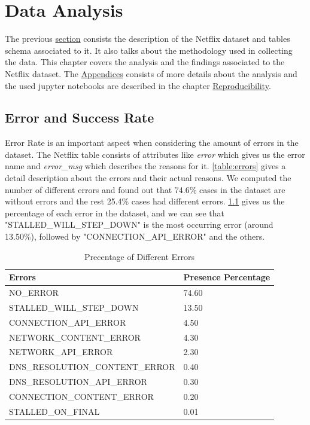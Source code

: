 \hypersetup{linkcolor=blue}
\chapter{Data Analysis}\label{chapter:Data Analysis}

The previous \hyperref[chapter:Datasets]{section} consists the description of the Netflix dataset and tables schema associated to it. It also talks about the methodology used in collecting the data. This chapter covers the analysis and the findings associated to the Netflix dataset. The \hyperref[appendix]{Appendices} consists of more details about the analysis and the used jupyter notebooks are described in the chapter \hyperref[chapter:Reproducibility]{Reproducibility}.   

\section{Error and Success Rate}\label{chapter:esrate}
Error Rate is an important aspect when considering the amount of errors in the dataset. The Netflix table consists of attributes like \textit{error} which gives us the error name and \textit{error\_msg} 
which describes the reasons for it. \cref{table:errors} gives a detail description about the errors and their actual reasons. 
We computed the number of different errors and found out that 74.6\% cases in the dataset are without errors and the rest 25.4\% cases had different errors. \cref{table:errpercentage} 
gives us the percentage of each error in the dataset, and we can see that "STALLED\_WILL\_STEP\_DOWN" is the most occurring error (around 13.50\%), followed by "CONNECTION\_API\_ERROR" and the others.  
\begin{table}[!h]
	\centering
	\caption{Precentage of Different Errors}
	\label{table:errpercentage}
	\begin{tabular}{lp{2cm}}
  		\toprule
  		\textbf{Errors} & \textbf{Presence Percentage} \\ 
  		\midrule
  		NO\_ERROR & 74.60 \\ 
  		STALLED\_WILL\_STEP\_DOWN & 13.50 \\
  		CONNECTION\_API\_ERROR & 4.50 \\
  		NETWORK\_CONTENT\_ERROR & 4.30 \\
  		NETWORK\_API\_ERROR & 2.30 \\
  		DNS\_RESOLUTION\_CONTENT\_ERROR & 0.40 \\  
		DNS\_RESOLUTION\_API\_ERROR &  0.30 \\ 
		CONNECTION\_CONTENT\_ERROR & 0.20 \\  
		STALLED\_ON\_FINAL & 0.01 \\
  		\bottomrule
\end{tabular}
\end{table}

